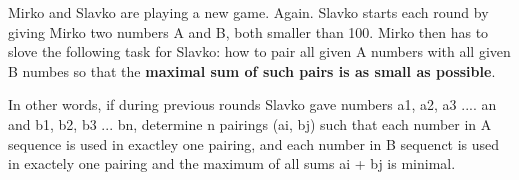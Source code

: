 Mirko and Slavko are playing a new game. Again. Slavko starts each round by giving Mirko two numbers A and B, both smaller than 100. Mirko then has to slove the following task for Slavko: how to pair all given A numbers with all given B numbes so that the \textbf{maximal sum of such pairs is as small as possible}.

In other words, if during previous rounds Slavko gave numbers a1, a2, a3 .... an and b1, b2, b3 ... bn, determine n pairings (ai, bj) such that each number in A sequence is used in exactley one pairing, and each number in B sequenct is used in exactely one pairing and the maximum of all sums ai + bj is minimal.